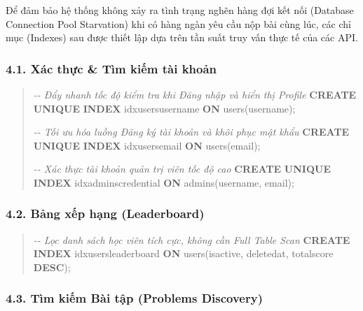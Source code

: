 \documentclass[12pt,a4paper]{article}
\renewcommand{\_}{\BreakableUnderscore}
\newenvironment{Shaded}{\vspace{3pt}\begin{quote}}{\end{quote}\vspace{3pt}}
\newcommand{\CommentTok}[1]{\textcolor[rgb]{0.38,0.63,0.69}{\textit{#1}}}
\newcommand{\KeywordTok}[1]{\textcolor[rgb]{0.00,0.44,0.13}{\textbf{#1}}}
\newcommand{\NormalTok}[1]{#1}
\begin{document}
Để đảm bảo hệ thống không xảy ra tình trạng nghẽn hàng đợi kết nối (Database Connection Pool Starvation) khi có hàng ngàn yêu cầu nộp bài cùng lúc, các chỉ mục (Indexes) sau được thiết lập dựa trên tần suất truy vấn thực tế của các API.

\subsubsection{4.1. Xác thực \& Tìm kiếm tài khoản}

\begin{Shaded}
\begin{Highlighting}[]
\CommentTok{{-}{-} Đẩy nhanh tốc độ kiểm tra khi Đăng nhập và hiển thị Profile}
\KeywordTok{CREATE} \KeywordTok{UNIQUE} \KeywordTok{INDEX}\NormalTok{ idx\_users\_username }\KeywordTok{ON}\NormalTok{ users(username);}

\CommentTok{{-}{-} Tối ưu hóa luồng Đăng ký tài khoản và khôi phục mật khẩu}
\KeywordTok{CREATE} \KeywordTok{UNIQUE} \KeywordTok{INDEX}\NormalTok{ idx\_users\_email }\KeywordTok{ON}\NormalTok{ users(email);}

\CommentTok{{-}{-} Xác thực tài khoản quản trị viên tốc độ cao}
\KeywordTok{CREATE} \KeywordTok{UNIQUE} \KeywordTok{INDEX}\NormalTok{ idx\_admins\_credential }\KeywordTok{ON}\NormalTok{ admins(username, email);}
\end{Highlighting}
\end{Shaded}

\subsubsection{4.2. Bảng xếp hạng (Leaderboard)}

\begin{Shaded}
\begin{Highlighting}[]
\CommentTok{{-}{-} Lọc danh sách học viên tích cực, không cần Full Table Scan}
\KeywordTok{CREATE} \KeywordTok{INDEX}\NormalTok{ idx\_users\_leaderboard }\KeywordTok{ON}\NormalTok{ users(is\_active, deleted\_at, total\_score }\KeywordTok{DESC}\NormalTok{);}
\end{Highlighting}
\end{Shaded}

\subsubsection{4.3. Tìm kiếm Bài tập (Problems Discovery)}
\end{document}
